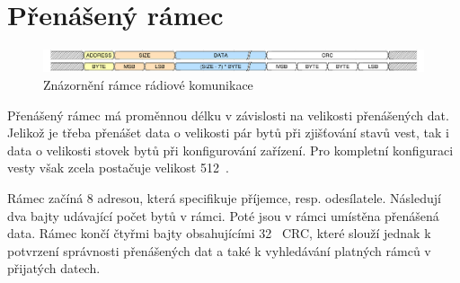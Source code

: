 \section{Přenášený rámec}
\begin{figure}[H]
    \begin{center}
        \includegraphics[width=\textwidth]{img/lgrf_packet}
    \end{center}
    \caption{Znázornění rámce rádiové komunikace}
\end{figure}

Přenášený rámec má proměnnou délku v závislosti na velikosti přenášených dat. Jelikož je třeba přenášet data o velikosti pár bytů při zjišťování stavů vest, tak i data o velikosti stovek bytů při konfigurování zařízení. Pro kompletní konfiguraci vesty však zcela postačuje velikost 512~.

Rámec začíná 8 adresou, která specifikuje příjemce, resp. odesílatele. Následují dva bajty udávající počet bytů v rámci. Poté jsou v rámci umístěna přenášená data. Rámec končí čtyřmi bajty obsahujícími 32~ CRC, které slouží jednak k potvrzení správnosti přenášených dat a také k vyhledávání platných rámců v přijatých datech.

